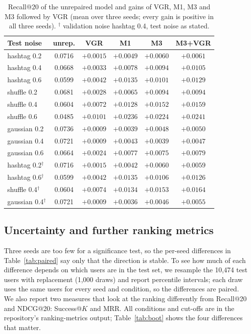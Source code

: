 \documentclass[conference]{IEEEtran}
\begin{document}
\begin{table}[t]
\centering\caption{Recall@20 of the unrepaired model and gains of VGR, M1, M3 and M3 followed by VGR (mean over three seeds; every gain is positive in all three seeds). $^\dagger$ validation noise hashtag 0.4, test noise as stated.}
\label{tab:grid}
\footnotesize\setlength{\tabcolsep}{3pt}
\begin{tabular}{@{}lccccc@{}}
\hline
Test noise & unrep. & VGR & M1 & M3 & M3+VGR \\
\hline
hashtag 0.2 & 0.0716 & $+0.0015$ & $+0.0049$ & $+0.0060$ & $+0.0061$ \\
hashtag 0.4 & 0.0668 & $+0.0033$ & $+0.0078$ & $+0.0094$ & $+0.0105$ \\
hashtag 0.6 & 0.0599 & $+0.0042$ & $+0.0135$ & $+0.0101$ & $+0.0129$ \\
shuffle 0.2 & 0.0681 & $+0.0028$ & $+0.0065$ & $+0.0094$ & $+0.0094$ \\
shuffle 0.4 & 0.0604 & $+0.0072$ & $+0.0128$ & $+0.0152$ & $+0.0159$ \\
shuffle 0.6 & 0.0485 & $+0.0101$ & $+0.0236$ & $+0.0224$ & $+0.0241$ \\
gaussian 0.2 & 0.0736 & $+0.0009$ & $+0.0039$ & $+0.0048$ & $+0.0050$ \\
gaussian 0.4 & 0.0721 & $+0.0009$ & $+0.0043$ & $+0.0039$ & $+0.0047$ \\
gaussian 0.6 & 0.0664 & $+0.0024$ & $+0.0077$ & $+0.0075$ & $+0.0079$ \\
\hline
hashtag 0.2$^\dagger$ & 0.0716 & $+0.0015$ & $+0.0042$ & $+0.0060$ & $+0.0059$ \\
hashtag 0.6$^\dagger$ & 0.0599 & $+0.0042$ & $+0.0135$ & $+0.0106$ & $+0.0126$ \\
shuffle 0.4$^\dagger$ & 0.0604 & $+0.0074$ & $+0.0134$ & $+0.0153$ & $+0.0164$ \\
gaussian 0.4$^\dagger$ & 0.0721 & $+0.0009$ & $+0.0036$ & $+0.0046$ & $+0.0055$ \\\hline
\end{tabular}
\end{table}

\subsection{Uncertainty and further ranking metrics}
\label{sec:uncertainty}

Three seeds are too few for a significance test, so the per-seed differences in Table~\ref{tab:paired} say only that the direction is stable. To see how much of each difference depends on which users are in the test set, we resample the 10,474 test users with replacement (1,000 draws) and report percentile intervals; each draw uses the same users for every seed and condition, so the differences are paired. We also report two measures that look at the ranking differently from Recall@20 and NDCG@20: Success@$K$ and MRR. All conditions and cut-offs are in the repository's ranking-metrics output; Table~\ref{tab:boot} shows the four differences that matter.
\end{document}
